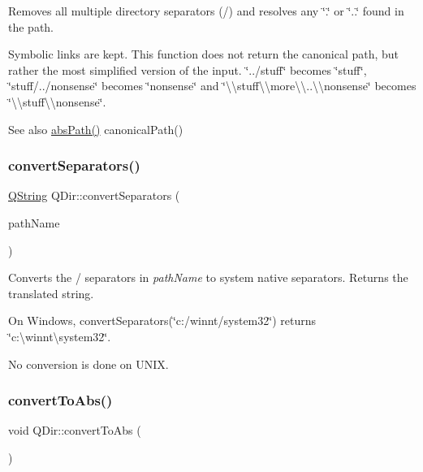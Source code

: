 Removes all multiple directory separators (\textquotesingle{}/\textquotesingle{}) and resolves any \char`\"{}.\char`\"{} or \char`\"{}..\char`\"{} found in the path.

Symbolic links are kept. This function does not return the canonical path, but rather the most simplified version of the input. \char`\"{}../stuff\char`\"{} becomes \char`\"{}stuff\char`\"{}, \char`\"{}stuff/../nonsense\char`\"{} becomes \char`\"{}nonsense\char`\"{} and \char`\"{}\textbackslash{}\textbackslash{}stuff\textbackslash{}\textbackslash{}more\textbackslash{}\textbackslash{}..\textbackslash{}\textbackslash{}nonsense\char`\"{} becomes \char`\"{}\textbackslash{}\textbackslash{}stuff\textbackslash{}\textbackslash{}nonsense\char`\"{}.

\begin{DoxySeeAlso}{See also}
\mbox{\hyperlink{class_q_dir_a1464e556606a3223b8db1b3629c41cb7}{abs\+Path()}} canonical\+Path() 
\end{DoxySeeAlso}
\mbox{\label{class_q_dir_a2cb829f147b7225abab1e5915ae62264}} 
\subsubsection{\texorpdfstring{convertSeparators()}{convertSeparators()}}
{\footnotesize\ttfamily \mbox{\hyperlink{class_q_string}{Q\+String}} Q\+Dir\+::convert\+Separators (\begin{DoxyParamCaption}\item[{const \mbox{\hyperlink{class_q_string}{Q\+String}} \&}]{path\+Name }\end{DoxyParamCaption})\hspace{0.3cm}{\ttfamily [static]}}

Converts the \textquotesingle{}/\textquotesingle{} separators in {\itshape path\+Name} to system native separators. Returns the translated string.

On Windows, convert\+Separators(\char`\"{}c\+:/winnt/system32\char`\"{}) returns \char`\"{}c\+:\textbackslash{}winnt\textbackslash{}system32\char`\"{}.

No conversion is done on U\+N\+IX. \mbox{\label{class_q_dir_a0c05c8978b3b4158233f809e4d30c55d}} 
\subsubsection{\texorpdfstring{convertToAbs()}{convertToAbs()}}
{\footnotesize\ttfamily void Q\+Dir\+::convert\+To\+Abs (\begin{DoxyParamCaption}{ }\end{DoxyParamCaption})\hspace{0.3cm}{\ttfamily [virtual]}}

